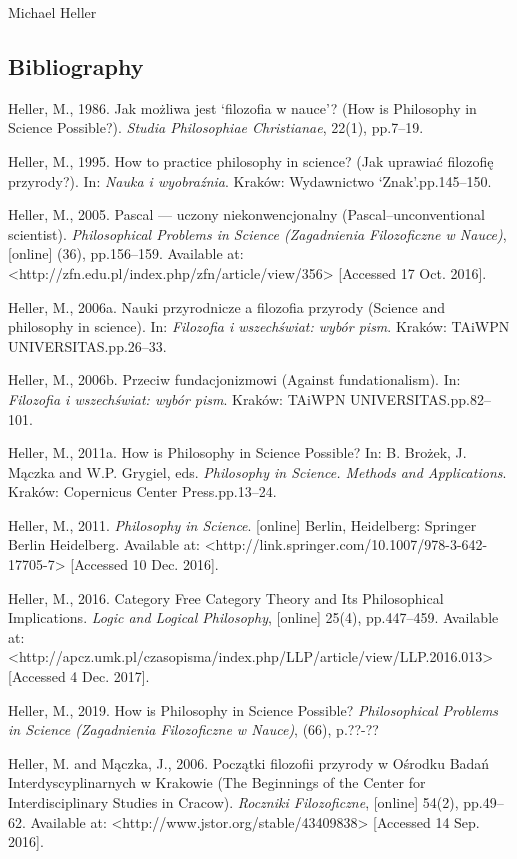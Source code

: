 \begin{artengenv}{Michael Heller}
\subsection[Bibliography]{Bibliography}
Heller, M., 1986. Jak możliwa jest ‘filozofia w nauce’? (How is Philosophy in Science Possible?). \textit{Studia
Philosophiae Christianae}, 22(1), pp.7–19.

Heller, M., 1995. How to practice philosophy in science? (Jak uprawiać filozofię przyrody?). In: \textit{Nauka i
wyobraźnia}. Kraków: Wydawnictwo ‘Znak’.pp.145–150.

Heller, M., 2005. Pascal — uczony niekonwencjonalny (Pascal–unconventional scientist). \textit{Philosophical Problems in
Science (Zagadnienia Filozoficzne w Nauce)}, [online] (36), pp.156–159. Available at:
{\textless}http://zfn.edu.pl/index.php/zfn/article/view/356{\textgreater} [Accessed 17 Oct. 2016].

Heller, M., 2006a. Nauki przyrodnicze a filozofia przyrody (Science and philosophy in science). In: \textit{Filozofia i
wszechświat: wybór pism}. Kraków: TAiWPN UNIVERSITAS.pp.26–33.

Heller, M., 2006b. Przeciw fundacjonizmowi (Against fundationalism). In: \textit{Filozofia i wszechświat: wybór pism}.
Kraków: TAiWPN UNIVERSITAS.pp.82–101.

Heller, M., 2011a. How is Philosophy in Science Possible? In: B. Brożek, J. Mączka and W.P. Grygiel, eds.
\textit{Philosophy in Science. Methods and Applications}. Kraków: Copernicus Center Press.pp.13–24.

Heller, M., 2011. \textit{Philosophy in Science}. [online] Berlin, Heidelberg: Springer Berlin Heidelberg. Available at:
{\textless}http://link.springer.com/10.1007/978-3-642-17705-7{\textgreater} [Accessed 10 Dec. 2016].

Heller, M., 2016. Category Free Category Theory and Its Philosophical Implications. \textit{Logic and Logical
Philosophy}, [online] 25(4), pp.447–459. Available at:
{\textless}http://apcz.umk.pl/czasopisma/index.php/LLP/article/view/LLP.2016.013{\textgreater} [Accessed 4 Dec. 2017].

Heller, M., 2019. How is Philosophy in Science Possible? \textit{Philosophical Problems in Science (Zagadnienia
Filozoficzne w Nauce)}, (66), p.??-??

Heller, M. and Mączka, J., 2006. Początki filozofii przyrody w Ośrodku Badań Interdyscyplinarnych w Krakowie (The
Beginnings of the Center for Interdisciplinary Studies in Cracow). \textit{Roczniki Filozoficzne}, [online] 54(2),
pp.49–62. Available at: {\textless}http://www.jstor.org/stable/43409838{\textgreater} [Accessed 14 Sep. 2016].


\end{artengenv}

